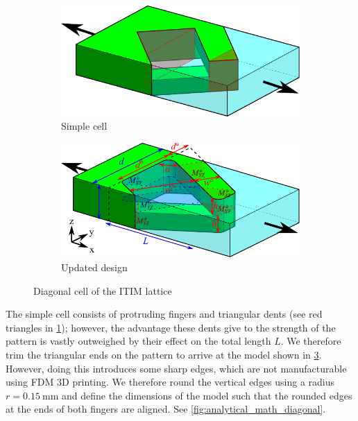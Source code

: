 \begin{figure}
	\centering
	\begin{subfigure}[B]{.49\columnwidth}
		\centering
		\includegraphics[width=\columnwidth]{sources/method/diagonal_model_simple_v5.pdf}
		\caption{Simple cell}
		\label{fig:diagonal_model_simple}
	\end{subfigure}
	\begin{subfigure}[B]{.7\columnwidth}
		\centering
		\includegraphics[width=\columnwidth]{sources/method/diagonal_model_v5.pdf}
		\caption{Updated design}
		\label{fig:diagonal_model}
	\end{subfigure}
	\caption{Diagonal cell of the ITIM lattice}
\end{figure}


The simple cell consists of protruding fingers and triangular dents (see red triangles in \cref{fig:diagonal_model_simple});
however, the advantage these dents give to the strength of the pattern is vastly outweighed by their effect on the total length $L$.
We therefore trim the triangular ends on the pattern to arrive at the model shown in \cref{fig:diagonal_model}.
However, doing this introduces some sharp edges, which are not manufacturable using FDM 3D printing.
We therefore round the vertical edges using a radius $r=\SI{0.15}{\milli\meter}$
and define the dimensions of the model such that the rounded edges at the ends of both fingers are aligned.
See \cref{fig:analytical_math_diagonal}.


